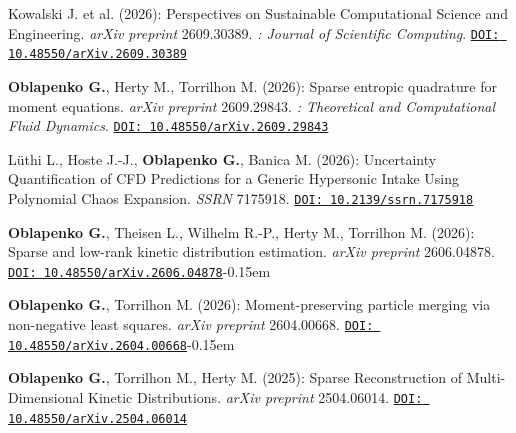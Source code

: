 
\begin{enumerate} 

  \preprintitem Kowalski J. et al. (2026): Perspectives on Sustainable Computational Science and Engineering. \textit{arXiv preprint} 2609.30389.  \textit{\underline{}: Journal of Scientific Computing}.
  \newline
    \href{https://doi.org/10.48550/arXiv.2609.30389}{\texttt{DOI: 10.48550/arXiv.2609.30389}}

  \preprintitem \textbf{Oblapenko G.}, Herty M., {Torrilhon M.} (2026): Sparse entropic quadrature for moment equations. \textit{arXiv preprint} 2609.29843.  \textit{\underline{}: Theoretical and Computational Fluid Dynamics}.
  \newline
    \href{https://doi.org/10.48550/arXiv.2609.29843}{\texttt{DOI: 10.48550/arXiv.2609.29843}}

  \preprintitem Lüthi L., Hoste J.-J., \textbf{Oblapenko G.}, Banica M. (2026): Uncertainty Quantification of CFD Predictions for a Generic Hypersonic Intake Using Polynomial Chaos Expansion. \textit{SSRN} 7175918.
  \newline
    \href{https://doi.org/10.2139/ssrn.7175918}{\texttt{DOI: 10.2139/ssrn.7175918}}

  \preprintitem \textbf{Oblapenko G.}, Theisen L., Wilhelm R.-P., Herty M., {Torrilhon M.} (2026): Sparse and low-rank kinetic distribution estimation. \textit{arXiv preprint} 2606.04878.
  \newline
    \href{https://doi.org/10.48550/arXiv.2606.04878}{\texttt{DOI: 10.48550/arXiv.2606.04878}}\itemsep-0.15em

  \preprintitem \textbf{Oblapenko G.}, {Torrilhon M.} (2026): Moment-preserving particle merging via non-negative least squares. \textit{arXiv preprint} 2604.00668.  
  \newline
    \href{https://doi.org/10.48550/arXiv.2604.00668}{\texttt{DOI: 10.48550/arXiv.2604.00668}}\itemsep-0.15em

  \preprintitem \textbf{Oblapenko G.}, {Torrilhon M.}, Herty M. (2025): Sparse Reconstruction of Multi-Dimensional Kinetic Distributions. \textit{arXiv preprint} 2504.06014. 
  \newline
    \href{https://doi.org/10.48550/arXiv.2504.06014}{\texttt{DOI: 10.48550/arXiv.2504.06014}}


\end{enumerate}
